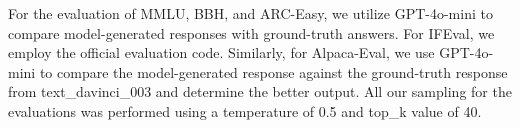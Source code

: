 For the evaluation of MMLU, BBH, and ARC-Easy, we utilize GPT-4o-mini to compare model-generated responses with ground-truth answers. For IFEval, we employ the official evaluation code. Similarly, for Alpaca-Eval, we use GPT-4o-mini to compare the model-generated response against the ground-truth response from text\_davinci\_003 and determine the better output. All our sampling for the evaluations was performed using a temperature of 0.5 and top\_k value of 40.


